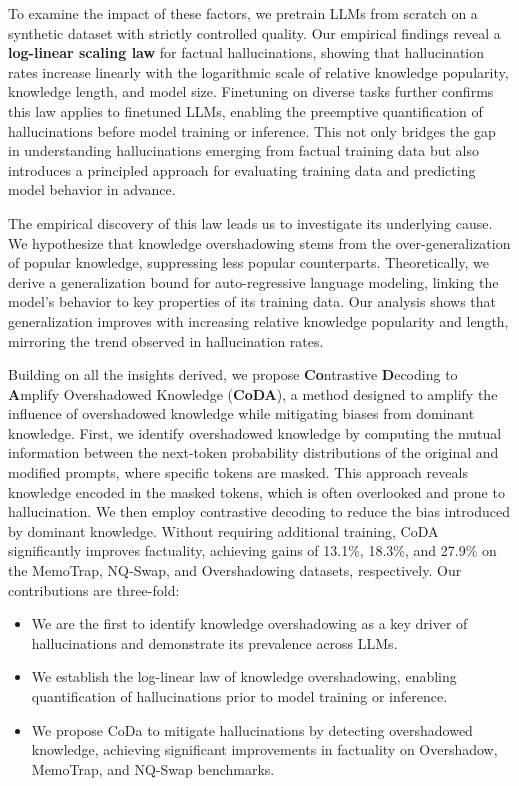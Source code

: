 To examine the impact of these factors, we pretrain LLMs from scratch on a synthetic dataset with strictly controlled quality. Our empirical findings reveal a \textbf{log-linear scaling law} for factual hallucinations, showing that hallucination rates increase linearly with the logarithmic scale of relative knowledge popularity, knowledge length, and model size. Finetuning on diverse tasks further confirms this law applies to finetuned LLMs, enabling the preemptive quantification of hallucinations before model training or inference. This not only bridges the gap in understanding hallucinations emerging from factual training data but also introduces a principled approach for evaluating training data and predicting model behavior in advance.


The empirical discovery of this law leads us to investigate its underlying cause. We hypothesize that knowledge overshadowing stems from the over-generalization of popular knowledge, suppressing less popular counterparts. Theoretically, we derive a generalization bound for auto-regressive language modeling, linking the model’s behavior to key properties of its training data. Our analysis shows that generalization improves with increasing relative knowledge popularity and length, mirroring the trend observed in hallucination rates.


Building on all the insights derived, we propose \textbf{Co}ntrastive \textbf{D}ecoding to \textbf{A}mplify Overshadowed Knowledge (\textbf{CoDA}), a method designed to amplify the influence of overshadowed knowledge while mitigating biases from dominant knowledge. First, we identify overshadowed knowledge by computing the mutual information between the next-token probability distributions of the original and modified prompts, where specific tokens are masked. This approach reveals knowledge encoded in the masked tokens, which is often overlooked and prone to hallucination. We then employ contrastive decoding to reduce the bias introduced by dominant knowledge. Without requiring additional training, CoDA significantly improves factuality, achieving gains of 13.1\%, 18.3\%, and 27.9\% on the MemoTrap, NQ-Swap, and Overshadowing datasets, respectively. Our contributions are three-fold:
\begin{itemize}[topsep=2pt, partopsep=-5pt, leftmargin=8pt, itemsep=-4.5pt]
\item We are the first to identify knowledge overshadowing as a key driver of hallucinations and demonstrate its prevalence across LLMs.
\item We establish the log-linear law of knowledge overshadowing, enabling quantification of hallucinations prior to model training or inference.
\item We propose CoDa to mitigate hallucinations by detecting overshadowed knowledge, achieving significant improvements in factuality on Overshadow, MemoTrap, and NQ-Swap benchmarks.
\end{itemize}
